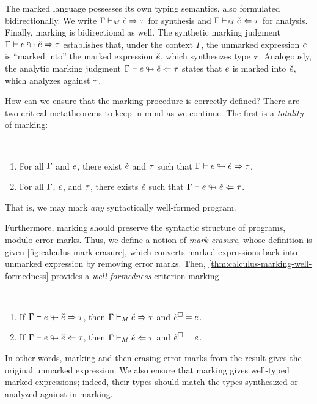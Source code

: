 The marked language possesses its own typing semantics, also formulated bidirectionally. We write
$\Gamma \vdash_{M} \check{e} \Rightarrow \tau$ for synthesis and $\Gamma \vdash_{M} \check{e} \Leftarrow \tau$ for analysis.
Finally, marking is bidirectional as well. The synthetic marking judgment
$\Gamma \vdash e \looparrowright \check{e} \Rightarrow \tau$ establishes that, under the context $\Gamma$, the
unmarked expression $e$ is ``marked into'' the marked expression $\check{e}$, which synthesizes type
$\tau$. Analogously, the analytic marking judgment $\Gamma \vdash e \looparrowright \check{e} \Leftarrow \tau$
states that $e$ is marked into $\check{e}$, which analyzes against $\tau$.

How can we ensure that the marking procedure is correctly defined? There are two critical
metatheorems to keep in mind as we continue. The first is a \emph{totality} of marking:
%
\begin{theorem}[name=Marking Totality] \
  \label{thm:calculus-marking-totality}
  \begin{enumerate}
    \item For all $\Gamma$ and $e$, there exist $\check{e}$ and $\tau$ such that
      $\Gamma \vdash e \looparrowright \check{e} \Rightarrow \tau$.
    \item For all $\Gamma$, $e$, and $\tau$, there exists $\check{e}$ such that
      $\Gamma \vdash e \looparrowright \check{e} \Leftarrow \tau$.
  \end{enumerate}
\end{theorem}
%
That is, we may mark \emph{any} syntactically well-formed program.

Furthermore, marking should preserve the syntactic structure of programs, modulo error marks. Thus,
we define a notion of \emph{mark erasure}, whose definition is given
\cref{fig:calculus-mark-erasure}, which converts marked expressions back into unmarked expression by
removing error marks. Then, \cref{thm:calculus-marking-well-formedness} provides a
\emph{well-formedness} criterion marking.
%
\begin{theorem}[name=Marking Well-Formedness] \
  \label{thm:calculus-marking-well-formedness}
  \begin{enumerate}
    \item If $\Gamma \vdash e \looparrowright \check{e} \Rightarrow \tau$, then $\Gamma \vdash_{M} \check{e} \Rightarrow \tau$ and
      $\check{e}^{\square} = e$.
    \item If $\Gamma \vdash e \looparrowright \check{e} \Leftarrow \tau$, then $\Gamma \vdash_{M} \check{e} \Leftarrow \tau$ and
      $\check{e}^{\square} = e$.
  \end{enumerate}
\end{theorem}
%
In other words, marking and then erasing error marks from the result gives the original unmarked
expression. We also ensure that marking gives well-typed marked expressions; indeed, their types
should match the types synthesized or analyzed against in marking.

